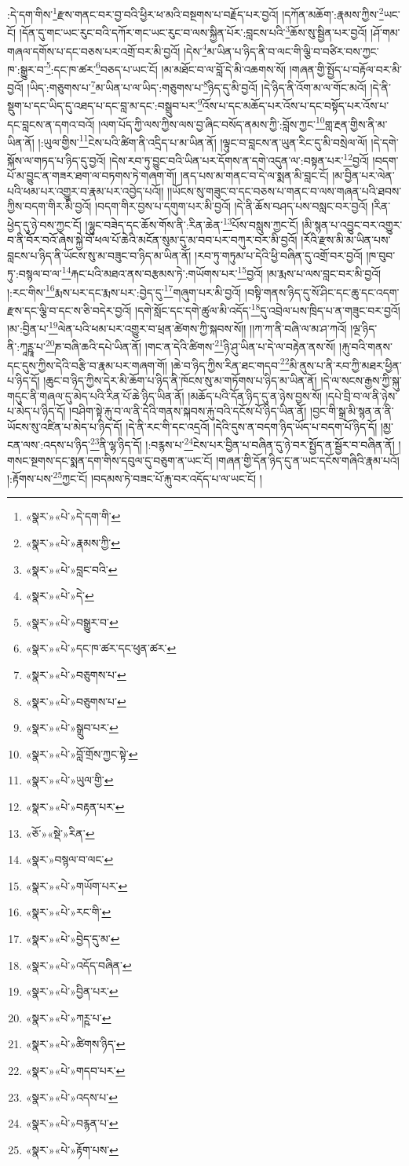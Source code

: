 :དེ་དག་གིས་\footnote{«སྣར་»«པེ་»དེ་དག་གི་}རྫས་གནང་བར་བྱ་བའི་ཕྱིར་ཕ་མའི་བསྔགས་པ་བརྗོད་པར་བྱའོ། །དཀོན་མཆོག་:རྣམས་ཀྱིས་\footnote{«སྣར་»«པེ་»རྣམས་ཀྱི་}ཡང་ངོ། །དོན་དུ་གང་ཡང་རུང་བའི་དཀོར་གང་ཡང་རུང་བ་ལས་སྐྱིན་པོར་:བླངས་པའི་\footnote{«སྣར་»«པེ་»བླང་བའི་}ཆོས་སུ་སྦྱིན་པར་བྱའོ། །ཤོ་གམ་གཞལ་དགོས་པ་དང་བཅས་པར་འགྲོ་བར་མི་བྱའོ། །དེས་\footnote{«སྣར་»«པེ་»དེ་}མ་ཡིན་པ་ཉིད་ནི་བ་ལང་གི་ལྕི་བ་བཙིར་བས་ཀྱང་ཁ་:སྒྱུར་བ་\footnote{«སྣར་»«པེ་»བསྒྱུར་བ་}:དང་ཁ་ཚར་\footnote{«སྣར་»«པེ་»དང་ཁ་ཚར་དང་ཕུན་ཚར་}བཅད་པ་ཡང་ངོ། །མ་མཐོང་བ་ལ་བློ་དེ་མི་འཆགས་སོ། །གཞན་གྱི་སྤྱོད་པ་བརྟོལ་བར་མི་བྱའོ། །ཡིད་:གཅུགས་པ་\footnote{«སྣར་»«པེ་»བཅུགས་པ་}མ་ཡིན་པ་ལ་ཡིད་:གཅུགས་པ་\footnote{«སྣར་»«པེ་»བཅུགས་པ་}ཉིད་དུ་མི་བྱའོ། །དེ་ཉིད་ནི་འོག་མ་ལ་གོང་མའོ། །དེ་ནི་སྡུག་པ་དང་ཡིད་དུ་འཐད་པ་དང་བླ་མ་དང་:བསྒྲུབ་པར་\footnote{«སྣར་»«པེ་»སྒྲུབ་པར་}འོས་པ་དང་མཆོད་པར་འོས་པ་དང་བསྟོད་པར་འོས་པ་དང་བླངས་ན་དགའ་བའོ། །ལག་པོད་ཀྱི་ལས་ཀྱིས་ལས་བྱ་ཞིང་བསོད་ནམས་ཀྱི་:བློས་ཀྱང་\footnote{«སྣར་»«པེ་»བློ་གྲོས་ཀྱང་སྟེ་}གླ་རྔན་གྱིས་ནི་མ་ཡིན་ནོ། །:ཡུལ་གྱིས་\footnote{«སྣར་»«པེ་»ཡུལ་གྱི་}ངེས་པའི་ཚིག་ནི་འདྲིད་པ་མ་ཡིན་ནོ། །ལྟུང་བ་བླངས་ན་ཡུན་རིང་དུ་མི་བསྲེལ་ལོ། །དེ་དགེ་སྐོས་ལ་གཏད་པ་ཉིད་དུ་བྱའོ། །དེས་རབ་ཏུ་བྱུང་བའི་ཡིན་པར་དོགས་ན་དགེ་འདུན་ལ་:བསྟན་པར་\footnote{«སྣར་»«པེ་»བརྟན་པར་}བྱའོ། །བདག་པོ་མ་བྱུང་ན་གཟར་ཐག་ལ་བཏགས་ཏེ་གཞག་གོ། །ནད་པས་མ་གནང་བ་དེ་ལ་སྨན་མི་བླང་ངོ། །མ་བྱིན་པར་ལེན་པའི་ཕམ་པར་འགྱུར་བ་རྣམ་པར་འབྱེད་པའོ།། །།ཡོངས་སུ་གཟུང་བ་དང་བཅས་པ་གནང་བ་ལས་གཞན་པའི་ཐབས་ཀྱིས་བདག་གིར་མི་བྱའོ། །བདག་གིར་བྱས་པ་དགུག་པར་མི་བྱའོ། །དེ་ནི་ཆོས་བཤད་པས་བསླང་བར་བྱའོ། །རིན་ཕྱེད་དུ་ཉེ་བས་ཀྱང་ངོ། །ལྷུང་བཟེད་དང་ཆོས་གོས་ནི་:རིན་ཆེན་\footnote{«ཅོ་»«སྡེ་»རིན་}པོས་བསླུས་ཀྱང་ངོ། །མི་སྙན་པ་འབྱུང་བར་འགྱུར་བ་ནི་བོར་བའོ་ཞེས་སྐྱེ་བོ་ཕལ་པོ་ཆེའི་མངོན་སུམ་དུ་མ་བབ་པར་བཀུར་བར་མི་བྱའོ། །རོའི་རྫས་མི་མ་ཡིན་པས་བླངས་པ་ཉིད་ནི་ཡོངས་སུ་མ་བཟུང་བ་ཉིད་མ་ཡིན་ནོ། །རབ་ཏུ་གཏུམ་པ་དེའི་ཕྱི་བཞིན་དུ་འགྲོ་བར་བྱའོ། །ཁ་བུབ་ཏུ་:བསྙལ་བ་ལ་\footnote{«སྣར་»བསྙལ་བ་ལང་}རྐང་པའི་མཐའ་ནས་བརྩམས་ཏེ་:གཡོགས་པར་\footnote{«སྣར་»«པེ་»གཡོག་པར་}བྱའོ། །མ་རྨས་པ་ལས་བླང་བར་མི་བྱའོ། །:རང་གིས་\footnote{«སྣར་»«པེ་»རང་གི་}རྨས་པར་དང་རྨས་པར་:བྱེད་དུ་\footnote{«སྣར་»«པེ་»བྱེད་དུ་མ་}གཞུག་པར་མི་བྱའོ། །བསྟི་གནས་ཉིད་དུ་སོ་ཤིང་དང་ཆུ་དང་འདག་རྫས་དང་ལྕི་བ་དང་ས་ཅི་བདེར་བྱའོ། །དགེ་སློང་དང་དགེ་ཚུལ་མི་འདོད་\footnote{«སྣར་»«པེ་»འདོད་བཞིན་}དུ་འབྲེལ་པས་ཁྲིད་པ་ན་གཟུང་བར་བྱའོ། །མ་:བྱིན་པ་\footnote{«སྣར་»«པེ་»བྱིན་པར་}ལེན་པའི་ཕམ་པར་འགྱུར་བ་ཕྲན་ཚེགས་ཀྱི་སྐབས་སོ།། །།ཀ་ཀ་ནི་བཞི་ལ་མ་ཤ་ཀའོ། །ལྔ་ཉིད་ནི་:ཀཱཪྵཱ་པ་\footnote{«སྣར་»«པེ་»ཀཪྵ་པ་}ཎ་བཞི་ཆའི་དཔེ་ཡིན་ནོ། །གང་ན་དེའི་ཚིགས་\footnote{«སྣར་»«པེ་»ཚིགས་ཉིད་}ཉི་ཤུ་ཡིན་པ་དེ་ལ་བརྟེན་ནས་སོ། །རྐུ་བའི་གནས་དང་དུས་ཀྱིས་དེའི་བརྩི་བ་རྣམ་པར་གཞག་གོ། །ཆེ་བ་ཉིད་ཀྱིས་རིན་ཐང་གདབ་\footnote{«སྣར་»«པེ་»གདབ་པར་}མི་ནུས་པ་ནི་རབ་ཀྱི་མཐར་ཕྱིན་པ་ཉིད་དོ། །ཆུང་བ་ཉིད་ཀྱིས་དེར་མི་ཆོག་པ་ཉིད་ནི་ཁོངས་སུ་མ་གཏོགས་པ་ཉིད་མ་ཡིན་ནོ། །དེ་ལ་སངས་རྒྱས་ཀྱི་སྐུ་གདུང་ནི་གཞལ་དུ་མེད་པའི་རིན་པོ་ཆེ་ཉིད་ཡིན་ནོ། །མཆོད་པའི་དོན་ཉིད་དུ་ན་ཉེས་བྱས་སོ། །དཔེ་བྲི་བ་ལ་ནི་ཉེས་པ་མེད་པ་ཉིད་དོ། །བཤིག་སྟེ་རྐུ་བ་ལ་ནི་དེའི་གནས་སྐབས་རྐུ་བའི་དངོས་པོ་ཉིད་ཡིན་ནོ། །བྱང་གི་སྒྲ་མི་སྙན་ན་ནི་ཡོངས་སུ་འཛིན་པ་མེད་པ་ཉིད་དོ། །དེ་ནི་རང་གི་དང་འདྲའོ། །དེའི་དུས་ན་བདག་ཉིད་ཡོད་པ་བདག་པོ་ཉིད་དོ། །མྱ་ངན་ལས་:འདས་པ་ཉིད་\footnote{«སྣར་»«པེ་»འདས་པ་}ནི་ལྷ་ཉིད་དོ། །:བརྙས་པ་\footnote{«སྣར་»«པེ་»བརྙན་པ་}ངེས་པར་བྱིན་པ་བཞིན་དུ་ཉེ་བར་སྤྱོད་ན་སྦྱོར་བ་བཞིན་ནོ། །གསང་སྔགས་དང་སྨན་དག་གིས་དབུལ་དུ་བཅུག་ན་ཡང་ངོ། །གཞན་གྱི་དོན་ཉིད་དུ་ན་ཡང་དངོས་གཞིའི་རྣམ་པའོ། །:རྟོགས་པས་\footnote{«སྣར་»«པེ་»རྟོག་པས་}ཀྱང་ངོ། །བདམས་ཏེ་བཟང་པོ་རྐུ་བར་འདོད་པ་ལ་ཡང་ངོ། །

